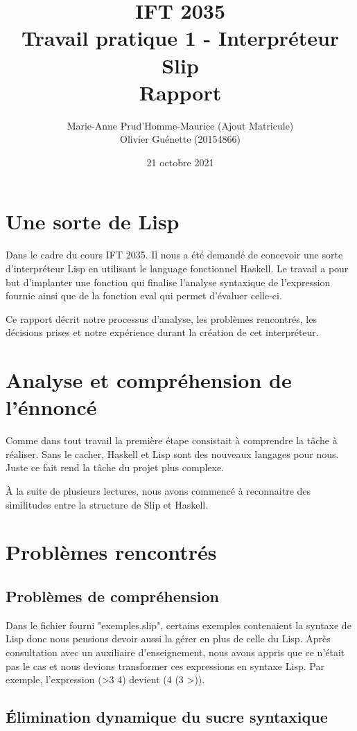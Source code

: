 \documentclass[12pt, letterpaper]{article}
\title{IFT 2035 \\ Travail pratique 1 - Interpréteur Slip \\ Rapport }
\author{ Marie-Anne Prud'Homme-Maurice (Ajout Matricule) 
\\ Olivier Guénette (20154866)}
\date{21 octobre 2021}
\begin{document}
\maketitle

\section*{Une sorte de Lisp}

Dans le cadre du cours IFT 2035. Il nous a été demandé de concevoir une sorte
d'interpréteur Lisp en utilisant le language fonctionnel Haskell. Le travail
a pour but d'implanter une fonction qui finalise l'analyse syntaxique de
l'expression fournie ainsi que de la fonction eval qui permet d'évaluer
celle-ci.

Ce rapport décrit notre processus d'analyse, les problèmes rencontrés,
les décisions prises et notre expérience durant la création de
cet interpréteur.

\section*{Analyse et compréhension de l'énnoncé}

Comme dans tout travail la première étape consistait à comprendre la tâche à
réaliser.  Sans le cacher, Haskell et Lisp sont des nouveaux langages pour nous.
Juste ce fait rend la tâche du projet plus complexe.

À la suite de plusieurs lectures, nous avons commencé à reconnaitre des 
similitudes entre la structure de Slip et Haskell.

\section*{Problèmes rencontrés}

\subsection*{Problèmes de compréhension}

Dans le fichier fourni "exemples.slip", certains exemples contenaient la 
syntaxe de Lisp donc nous pensions devoir aussi la gérer en plus de celle 
du Lisp. Après consultation avec un auxiliaire d'enseignement, nous avons 
appris que ce n'était pas le cas et nous devions transformer ces 
expressions en syntaxe Lisp. Par exemple, l'expression (\textgreater 3 4) 
devient (4 (3 \textgreater)).

\subsection*{Élimination dynamique du sucre syntaxique}
\end{document}
